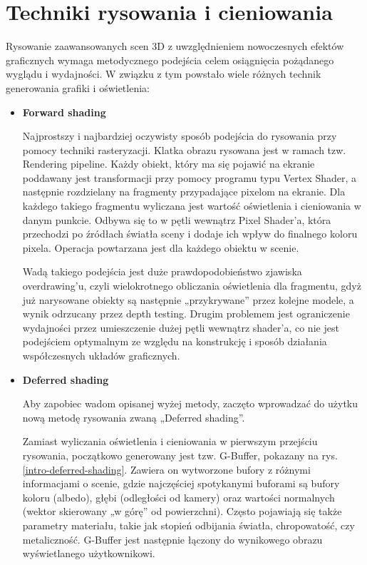 \section{Techniki rysowania i cieniowania}

Rysowanie zaawansowanych scen 3D z uwzględnieniem nowoczesnych efektów graficznych wymaga metodycznego podejścia celem osiągnięcia pożądanego wyglądu i wydajności. W związku z tym powstało wiele różnych technik generowania grafiki i oświetlenia:

\begin{itemize}
	\item \textbf{Forward shading}
	
	Najprostszy i najbardziej oczywisty sposób podejścia do rysowania przy pomocy techniki rasteryzacji. Klatka obrazu rysowana jest w ramach tzw. Rendering pipeline. Każdy obiekt, który ma się pojawić na ekranie poddawany jest transformacji przy pomocy programu typu Vertex Shader, a następnie rozdzielany na fragmenty przypadające pixelom na ekranie. Dla każdego takiego fragmentu wyliczana jest wartość oświetlenia i cieniowania w danym punkcie. Odbywa się to w pętli wewnątrz Pixel Shader'a, która przechodzi po źródłach światła sceny i dodaje ich wpływ do finalnego koloru pixela. Operacja powtarzana jest dla każdego obiektu w scenie.
	
	Wadą takiego podejścia jest duże prawdopodobieństwo zjawiska overdrawing'u, czyli wielokrotnego obliczania oświetlenia dla fragmentu, gdyż już narysowane obiekty są następnie „przykrywane'' przez kolejne modele, a wynik odrzucany przez depth testing. Drugim problemem jest ograniczenie wydajności przez umieszczenie dużej pętli wewnątrz shader'a, co nie jest podejściem optymalnym ze względu na konstrukcję i sposób działania współczesnych układów graficznych.
	
	\item \textbf{Deferred shading}
	
	Aby zapobiec wadom opisanej wyżej metody, zaczęto wprowadzać do użytku nową metodę rysowania zwaną „Deferred shading''.
	
	Zamiast wyliczania oświetlenia i cieniowania w pierwszym przejściu rysowania, początkowo generowany jest tzw. G-Buffer, pokazany na rys. \ref{intro-deferred-shading}. Zawiera on wytworzone bufory z różnymi informacjami o scenie, gdzie najczęściej spotykanymi buforami są bufory koloru (albedo), głębi (odległości od kamery) oraz wartości normalnych (wektor skierowany „w górę'' od powierzchni). Często pojawiają się także parametry materiału, takie jak stopień odbijania światła, chropowatość, czy metaliczność. G-Buffer jest następnie łączony do wynikowego obrazu wyświetlanego użytkownikowi.
	

\end{itemize}
